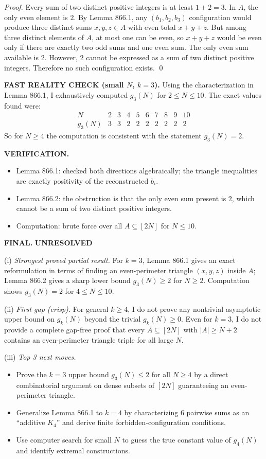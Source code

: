 \smallskip
\noindent\emph{Proof.}
Every sum of two distinct positive integers is at least $1+2=3$.
In $A$, the only even element is $2$. By Lemma 866.1, any $(b_1,b_2,b_3)$ configuration would produce three distinct sums $x,y,z\in A$ with even total $x+y+z$.
But among three distinct elements of $A$, at most one can be even, so $x+y+z$ would be even only if there are exactly two odd sums and one even sum.
The only even sum available is $2$.
However, $2$ cannot be expressed as a sum of two distinct positive integers.
Therefore no such configuration exists.
\qed

\medskip
\noindent\textbf{FAST REALITY CHECK (small $N$, $k=3$).}
Using the characterization in Lemma 866.1, I exhaustively computed $g_3(N)$ for $2\le N\le 10$.
The exact values found were:
\[
\begin{array}{c|ccccccccc}
N & 2&3&4&5&6&7&8&9&10\\\hline
g_3(N) & 3&3&2&2&2&2&2&2&2
\end{array}
\]
So for $N\ge 4$ the computation is consistent with the statement $g_3(N)=2$.

\medskip
\noindent\textbf{VERIFICATION.}
\begin{itemize}
\item Lemma 866.1: checked both directions algebraically; the triangle inequalities are exactly positivity of the reconstructed $b_i$.
\item Lemma 866.2: the obstruction is that the only even sum present is $2$, which cannot be a sum of two distinct positive integers.
\item Computation: brute force over all $A\subseteq[2N]$ for $N\le 10$.
\end{itemize}

\medskip
\noindent\textbf{FINAL.} \textbf{UNRESOLVED}

(i) \emph{Strongest proved partial result.}
For $k=3$, Lemma 866.1 gives an exact reformulation in terms of finding an even-perimeter triangle $(x,y,z)$ inside $A$; Lemma 866.2 gives a sharp lower bound $g_3(N)\ge 2$ for $N\ge 2$. Computation shows $g_3(N)=2$ for $4\le N\le 10$.

(ii) \emph{First gap (crisp).}
For general $k\ge 4$, I do not prove any nontrivial asymptotic upper bound on $g_k(N)$ beyond the trivial $g_k(N)\ge 0$.
Even for $k=3$, I do not provide a complete gap-free proof that every $A\subseteq[2N]$ with $|A|\ge N+2$ contains an even-perimeter triangle triple for all large $N$.

(iii) \emph{Top 3 next moves.}
\begin{itemize}
\item Prove the $k=3$ upper bound $g_3(N)\le 2$ for all $N\ge 4$ by a direct combinatorial argument on dense subsets of $[2N]$ guaranteeing an even-perimeter triangle.
\item Generalize Lemma 866.1 to $k=4$ by characterizing 6 pairwise sums as an ``additive $K_4$'' and derive finite forbidden-configuration conditions.
\item Use computer search for small $N$ to guess the true constant value of $g_4(N)$ and identify extremal constructions.
\end{itemize}

